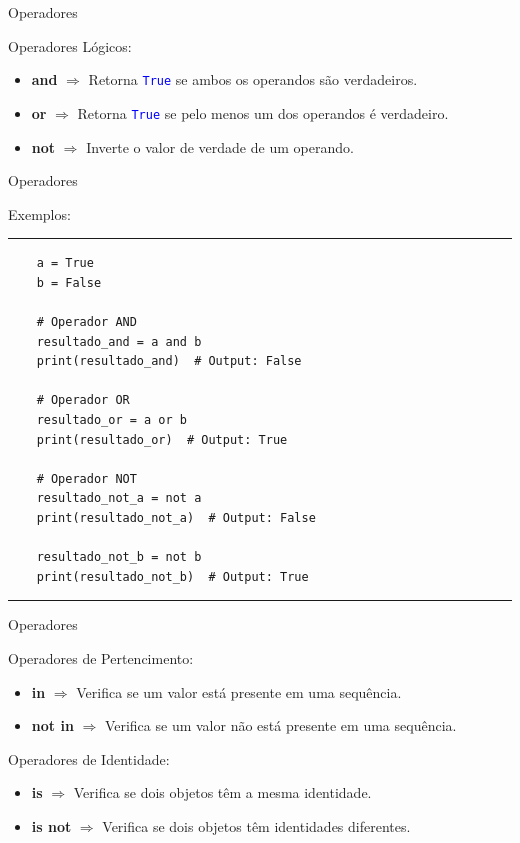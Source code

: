 \documentclass{beamer}
\begin{document}
\begin{frame}[fragile]{Operadores}
	
	\label{operadores_logicos}
	Operadores Lógicos:
	
	\begin{itemize}
	    \item \textbf{and} $\Rightarrow$ Retorna \texttt{\textcolor{blue}{True}} se ambos os operandos são verdadeiros.
		\item \textbf{or} $\Rightarrow$ Retorna \texttt{\textcolor{blue}{True}}  se pelo menos um dos operandos é verdadeiro.
		\item \textbf{not} $\Rightarrow$ Inverte o valor de verdade de um operando.
	\end{itemize}
	
\end{frame}

\begin{frame}[fragile]{Operadores}
	
	\label{operadores_logicos_exemplos}
	Exemplos:
	
\rule{\textwidth}{1pt}
\scriptsize
\begin{verbatim}
	a = True
	b = False
	
	# Operador AND
	resultado_and = a and b
	print(resultado_and)  # Output: False
	
	# Operador OR
	resultado_or = a or b
	print(resultado_or)  # Output: True
	
	# Operador NOT
	resultado_not_a = not a
	print(resultado_not_a)  # Output: False
	
	resultado_not_b = not b
	print(resultado_not_b)  # Output: True

\end{verbatim}
\rule{\textwidth}{1pt}

\end{frame}

\begin{frame}[fragile]{Operadores}
	
	\label{operadores_pertinencia}
	Operadores de Pertencimento:
	
	\begin{itemize}
	    \item \textbf{in} $\Rightarrow$ Verifica se um valor está presente em uma sequência.
		\item \textbf{not in} $\Rightarrow$ Verifica se um valor não está presente em uma sequência.
	\end{itemize}

	Operadores de Identidade:
	
	\begin{itemize}
		\item \textbf{is} $\Rightarrow$ Verifica se dois objetos têm a mesma identidade.
		\item \textbf{is not} $\Rightarrow$ Verifica se dois objetos têm identidades diferentes.
	\end{itemize}
	
\end{frame}
\end{document}
